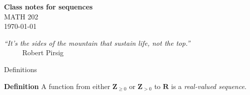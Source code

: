 \documentclass[portrait,fleqn,12pt]{beamer}
\newcommand{\reals}{\mathbf{R}}
\newcommand{\integers}{\mathbf{Z}}
\newenvironment{define}[1]{
  \textbf{Definition} #1}{}
\begin{document}
\begin{frame}
\begin{flushleft} 
\textbf{Class notes for sequences} \\
MATH 202 \\
\today 
\end{flushleft}


\emph{“It's the sides of the mountain that sustain life, not the top.”} \\
$\phantom{xxxx}$ \hfill {\sc Robert Pirsig} 
\end{frame}


\begin{frame}{Definitions}


\begin{define} A function from either \(\integers_{\geq 0}\) or \(\integers_{> 0}\)
to \(\reals\) is a \emph{real-valued sequence}.
\end{define}
\vfill

\end{frame}
\end{document}
